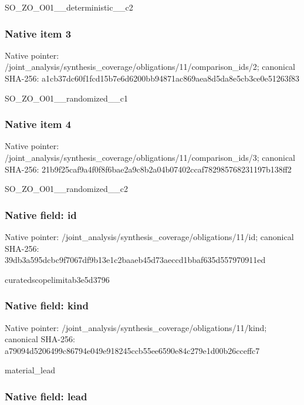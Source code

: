 \documentclass[10pt,a4paper]{article}
\begin{document}
SO\_ZO\_O01\_\_deterministic\_\_c2


\subsubsection{Native item 3}


Native pointer: /joint\_analysis/synthesi\allowbreak{}s\_coverage/obligations/1\allowbreak{}1/comparison\_ids/2; canonical SHA-256: a1cb37dc60f1fcd15b7e6d62\allowbreak{}00bb94871ac869aea8d5da8e\allowbreak{}5cb3ce0e51263f83


SO\_ZO\_O01\_\_randomized\_\_c1


\subsubsection{Native item 4}


Native pointer: /joint\_analysis/synthesi\allowbreak{}s\_coverage/obligations/1\allowbreak{}1/comparison\_ids/3; canonical SHA-256: 21b9f25caf9a4f0f8f6bae2a\allowbreak{}9c8b2a04b07402ccaf782985\allowbreak{}768231197b138ff2


SO\_ZO\_O01\_\_randomized\_\_c2


\subsubsection{Native field: id}


Native pointer: /joint\_analysis/synthesi\allowbreak{}s\_coverage/obligations/1\allowbreak{}1/id; canonical SHA-256: 39db3a595dcbc9f7067df9b1\allowbreak{}3e1c2baaeb45d73aeccd1bba\allowbreak{}f635d557970911ed


curatedscopelimitab3e5d3796


\subsubsection{Native field: kind}


Native pointer: /joint\_analysis/synthesi\allowbreak{}s\_coverage/obligations/1\allowbreak{}1/kind; canonical SHA-256: a79094d5206499c86794e049\allowbreak{}e918245ccb55ee6590e84c27\allowbreak{}9e1d00b26cceffc7


material\_lead


\subsubsection{Native field: lead}
\end{document}

